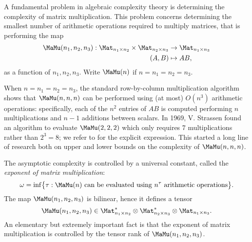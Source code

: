 A fundamental problem in algebraic complexity theory is determining the complexity of matrix multiplication. This problem concerns determining the smallest number of arithmetic operations required to multiply matrices, that is performing the map 
\[
\begin{aligned}
\MaMu(n_1,n_2,n_3) : \Mat_{n_1 \times n_2} \times \Mat_{n_2 \times n_3} &\to \Mat_{n_1 \times n_3} \\
(A , B) &\mapsto AB,
\end{aligned}
\]
as a function of $n_1,n_2,n_3$. Write $\MaMu(n)$ if $n=n_1=n_2=n_3$.

When $n = n_1=n_2=n_3$, the standard row-by-column multiplication algorithm shows that $\MaMu(n,n,n)$ can be performed using (at most) $O(n^3)$ arithmetic operations: specifically, each of the $n^2$ entries of $AB$ is computed performing $n$ multiplications and $n-1$ additions between scalars. In 1969, V. Strassen \cite{Str69} found an algorithm to evaluate $\MaMu(2,2,2)$ which only requires $7$ multiplications rather than $2^3 = 8$; we refer to \cite[Section 1.1.1]{Lan12} for the explicit expression. This started a long line of research both on upper and lower bounds on the complexity of $\MaMu(n,n,n)$. 

The asymptotic complexity is controlled by a universal constant, called the \emph{exponent of matrix multiplication}:
\[
\omega = \inf \bigl\{ \tau : \MaMu(n) \text{ can be evaluated using $n^\tau$ arithmetic operations} \bigr\}.
\]
The map $\MaMu(n_1,n_2,n_3)$ is bilinear, hence it defines a tensor 
\[
\MaMu(n_1,n_2,n_3) \in \Mat_{n_1 \times n_2}^* \otimes \Mat_{n_2 \times n_3}^* \otimes \Mat_{n_1 \times n_3}.
\]
An elementary but extremely important fact is that the exponent of matrix multiplication is controlled by the tensor rank of $\MaMu(n_1,n_2,n_3)$.


